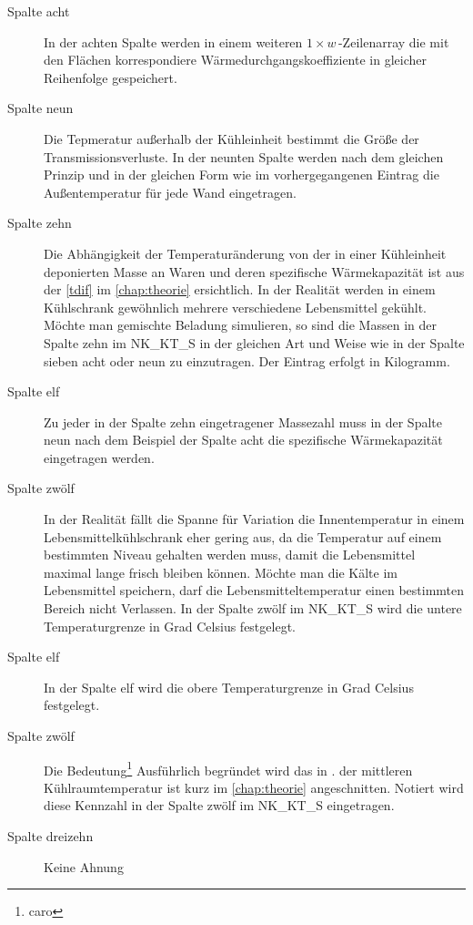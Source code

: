 \begin{description}
	\item [{Spalte acht}] In der achten Spalte werden in einem weiteren
	$1\times w\,$-Zeilenarray die mit den Flächen korrespondiere
	Wärmedurchgangskoeffiziente in gleicher
	Reihenfolge gespeichert.

	\item [{Spalte neun}] Die Tepmeratur außerhalb der Kühleinheit
	bestimmt die Größe der Transmissionsverluste. In
	der neunten Spalte werden nach dem gleichen Prinzip und in der gleichen
	Form wie im vorhergegangenen Eintrag die Außentemperatur für jede Wand
	eingetragen.

	\item [{Spalte zehn}] Die Abhängigkeit der Temperaturänderung von der in
	einer Kühleinheit deponierten Masse an Waren und deren spezifische
	Wärmekapazität ist aus der \cref{tdif} im \cref{chap:theorie}
	ersichtlich. In der Realität werden in einem Kühlschrank gewöhnlich
	mehrere verschiedene Lebensmittel gekühlt. Möchte man gemischte Beladung
	simulieren, so sind die Massen in der Spalte zehn im NK\_KT\_S in der
	gleichen Art und Weise wie in der Spalte sieben acht oder neun zu
	einzutragen. Der Eintrag erfolgt in Kilogramm.

	\item [{Spalte elf}] Zu jeder in der Spalte zehn eingetragener Massezahl
	muss in der Spalte neun nach dem Beispiel der Spalte acht die
	spezifische Wärmekapazität eingetragen werden.

	\item [{Spalte zwölf}] In der Realität fällt die Spanne für Variation
	die Innentemperatur in einem Lebensmittelkühlschrank eher gering aus, da
	die Temperatur auf einem bestimmten Niveau gehalten werden muss, damit
	die Lebensmittel maximal lange frisch bleiben können. Möchte man die
	Kälte im Lebensmittel speichern, darf die Lebensmitteltemperatur einen
	bestimmten Bereich nicht Verlassen. In der Spalte zwölf im NK\_KT\_S
	wird die untere Temperaturgrenze in Grad Celsius festgelegt.

	\item [{Spalte elf}] In der Spalte elf wird die obere Temperaturgrenze
	in Grad Celsius festgelegt.

	\item [{Spalte zwölf}] Die Bedeutung\footnote{caro}{
	Ausführlich begründet wird das in \cite{caro}.} der mittleren
	Kühlraumtemperatur ist kurz im \cref{chap:theorie} angeschnitten.
	Notiert wird diese Kennzahl in der Spalte zwölf im NK\_KT\_S
	eingetragen.

	\item [{Spalte dreizehn}] Keine Ahnung

\end{description}
